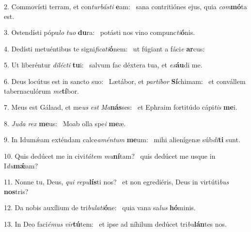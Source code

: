 2. Commovísti terram, et con\textit{tur}\textit{bás}\textit{ti} \textbf{e}am: \ast\  sana contritiónes ejus, quia \textit{com}\textbf{mó}ta est.\

3. Ostendísti pópu\textit{lo} \textit{tu}\textit{o} \textbf{du}ra: \ast\  potásti nos vino compunc\textit{ti}\textbf{ó}nis.\

4. Dedísti metuéntibus te signi\textit{fi}\textit{ca}\textit{ti}\textbf{ó}nem: \ast\  ut fúgiant a fáci\textit{e} \textbf{ar}cus:\

5. Ut liberéntur \textit{di}\textit{léc}\textit{ti} \textbf{tu}i: \ast\  salvum fac déxtera tua, et \textit{ex}\textbf{áu}di me.\

6. Deus locútus est in sancto suo: \dag\  Lætábor, et \textit{par}\textit{tí}\textit{bor} \textbf{Sí}chimam: \ast\  et convállem tabernaculórum \textit{me}\textbf{tí}bor.\

7. Meus est Gálaad, et me\textit{us} \textit{est} \textit{Ma}\textbf{nás}ses: \ast\  et Ephraim fortitúdo cápi\textit{tis} \textbf{me}i.\

8. \textit{Ju}\textit{da} \textit{rex} \textbf{me}us: \ast\  Moab olla spe\textit{i} \textbf{me}æ.\

9. In Idumǽam exténdam calce\textit{a}\textit{mén}\textit{tum} \textbf{me}um: \ast\  mihi alienígenæ súb\textit{di}\textbf{ti} sunt.\

10. Quis dedúcet me in civi\textit{tá}\textit{tem} \textit{mu}\textbf{ní}tam? \ast\  quis dedúcet me usque in I\textit{du}\textbf{mǽ}am?\

11. Nonne tu, Deus, \textit{qui} \textit{re}\textit{pu}\textbf{lís}ti nos? \ast\  et non egrediéris, Deus in virtúti\textit{bus} \textbf{nos}tris?\

12. Da nobis auxílium de tri\textit{bu}\textit{la}\textit{ti}\textbf{ó}ne: \ast\  quia vana sa\textit{lus} \textbf{hó}minis.\

13. In Deo faci\textit{é}\textit{mus} \textit{vir}\textbf{tú}tem: \ast\  et ipse ad níhilum dedúcet tri\textit{bu}\textbf{lán}tes nos.\

